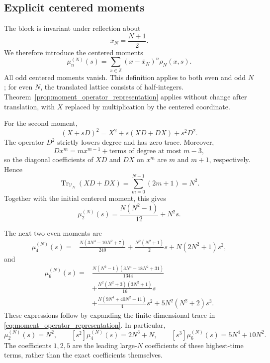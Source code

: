 \documentclass[11pt]{article}
\numberwithin{equation}{section}
\newcommand{\1}{\mathbf 1}
\begin{document}
\subsection{Explicit centered moments}
\label{sec:explicit_moments_catalan}
The block is invariant under reflection about
\[
    \bar x_N=\frac{N+1}{2}.
\]
We therefore introduce the centered moments
\begin{equation}
    \mu_n^{(N)}(s)
    =
    \sum_{x\in\mathbb Z}
    (x-\bar x_N)^n\rho_N(x,s).
    \label{eq:moment_definition_centered}
\end{equation}
All odd centered moments vanish.  This definition applies to both even and odd
\(N\); for even \(N\), the translated lattice consists of half-integers.
Theorem~\ref{prop:moment_operator_representation} applies without change after
translation, with \(X\) replaced by multiplication by the centered coordinate.

For the second moment,
\[
    (X+sD)^2=X^2+s(XD+DX)+s^2D^2.
\]
The operator \(D^2\) strictly lowers degree and has zero trace.  Moreover,
\[
    Dx^m=mx^{m-1}+\text{terms of degree at most }m-3,
\]
so the diagonal coefficients of \(XD\) and \(DX\) on \(x^m\) are \(m\) and
\(m+1\), respectively.  Hence
\[
    \operatorname{Tr}_{\mathcal V_N}(XD+DX)
    =
    \sum_{m=0}^{N-1}(2m+1)=N^2.
\]
Together with the initial centered moment, this gives
\begin{equation}
    \mu_2^{(N)}(s)
    =
    \frac{N(N^2-1)}{12}+N^2s.
    \label{eq:mu2_centered_N}
\end{equation}

The next two even moments are
\begin{equation}
\begin{aligned}
    \mu_4^{(N)}(s)
    ={}&
    \frac{N(3N^4-10N^2+7)}{240}
    +\frac{N^2(N^2+1)}{2}s
    +N(2N^2+1)s^2,
\end{aligned}
\label{eq:mu4_centered}
\end{equation}
and
\begin{equation}
\begin{aligned}
    \mu_6^{(N)}(s)
    ={}&
    \frac{N(N^2-1)(3N^4-18N^2+31)}{1344}
    \\
    &+\frac{N^2(N^2+3)(3N^2+1)}{16}s
    \\
    &+\frac{N(9N^4+40N^2+11)}{4}s^2
    +5N^2(N^2+2)s^3.
\end{aligned}
\label{eq:mu6_centered}
\end{equation}
These expressions follow by expanding the finite-dimensional trace in
\eqref{eq:moment_operator_representation}.  In particular,
\begin{equation}
    [s]\mu_2^{(N)}(s)=N^2,
    \qquad
    [s^2]\mu_4^{(N)}(s)=2N^3+N,
    \qquad
    [s^3]\mu_6^{(N)}(s)=5N^4+10N^2.
    \label{eq:top_low_moments}
\end{equation}
The coefficients \(1,2,5\) are the leading large-\(N\) coefficients of these
highest-time terms, rather than the exact coefficients themselves.
\end{document}
